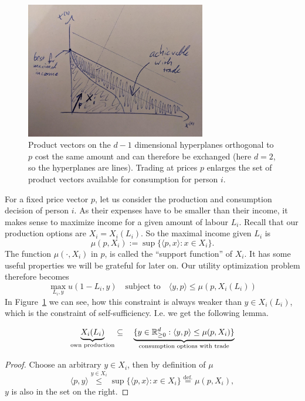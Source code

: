 \begin{figure}
	\centering
	\includegraphics[width=0.7\textwidth]{images/consumption_increase_by_trade.jpeg}
	\caption{
		Product vectors on the \(d-1\) dimensional hyperplanes orthogonal to \(p\)
		cost the same amount and can therefore be exchanged (here \(d=2\), so the
		hyperplanes are lines). Trading at prices \(p\) enlarges the set of
		product vectors available for consumption for person \(i\).
	}
	\label{fig: consumption increase by trade}
\end{figure}
For a fixed price vector \(p\), let us consider the production and consumption
decision of person \(i\). As their expenses have to be smaller than their
income, it makes sense to maximize income for a given amount of labour \(L_i\).
Recall that our production options are \(X_i=X_i(L_i)\). So the maximal income
given \(L_i\) is
\[
	\tag{income}\label{eq: income}
	\mu(p, X_i) := \sup\{\langle p, x\rangle : x\in X_i\}.
\]
The function \(\mu(\cdot, X_i)\) in \(p\), is called the ``support function'' of
\(X_i\). It has some useful properties we will be grateful for later on. Our
utility optimization problem therefore becomes
\[
	\max_{L_i, y} u(1-L_i, y) \quad\text{subject to}\quad \langle y, p\rangle \le \mu(p, X_i(L_i))
\]
In Figure~\ref{fig: consumption increase by trade} we can see, how this
constraint is always weaker than \(y\in X_i(L_i)\), which is the constraint of
self-sufficiency. I.e. we get the following lemma.

\begin{lemma}
\[
	\underbrace{X_i(L_i)}_{\text{own production}}
	\subseteq \quad
	\underbrace{
		\{y\in\mathbb{R}_{\ge 0}^d: \langle y, p\rangle \le \mu(p, X_i)\}
	}_{\text{consumption options with trade}}
\]
\end{lemma}
\begin{proof}
	Choose an arbitrary \(y\in X_i\), then by definition of \(\mu\)
	\[
		\langle p, y\rangle \overset{y\in X_i}\le \sup\{\langle p, x\rangle : x\in
		X_i\} \overset{\text{def.}}= \mu(p, X_i),
	\]
	\(y\) is also in the set on the right.
\end{proof}





